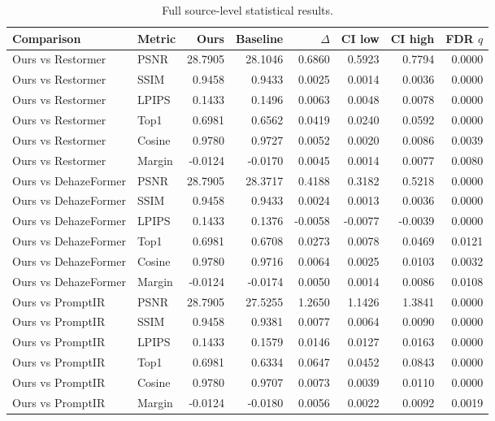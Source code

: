 \begin{longtable}{llrrrrrr}
\caption{Full source-level statistical results.} \\
\toprule
Comparison & Metric & Ours & Baseline & $\Delta$ & CI low & CI high & FDR $q$ \\
\midrule
Ours vs Restormer & PSNR & 28.7905 & 28.1046 & 0.6860 & 0.5923 & 0.7794 & 0.0000 \\
Ours vs Restormer & SSIM & 0.9458 & 0.9433 & 0.0025 & 0.0014 & 0.0036 & 0.0000 \\
Ours vs Restormer & LPIPS & 0.1433 & 0.1496 & 0.0063 & 0.0048 & 0.0078 & 0.0000 \\
Ours vs Restormer & Top1 & 0.6981 & 0.6562 & 0.0419 & 0.0240 & 0.0592 & 0.0000 \\
Ours vs Restormer & Cosine & 0.9780 & 0.9727 & 0.0052 & 0.0020 & 0.0086 & 0.0039 \\
Ours vs Restormer & Margin & -0.0124 & -0.0170 & 0.0045 & 0.0014 & 0.0077 & 0.0080 \\
Ours vs DehazeFormer & PSNR & 28.7905 & 28.3717 & 0.4188 & 0.3182 & 0.5218 & 0.0000 \\
Ours vs DehazeFormer & SSIM & 0.9458 & 0.9433 & 0.0024 & 0.0013 & 0.0036 & 0.0000 \\
Ours vs DehazeFormer & LPIPS & 0.1433 & 0.1376 & -0.0058 & -0.0077 & -0.0039 & 0.0000 \\
Ours vs DehazeFormer & Top1 & 0.6981 & 0.6708 & 0.0273 & 0.0078 & 0.0469 & 0.0121 \\
Ours vs DehazeFormer & Cosine & 0.9780 & 0.9716 & 0.0064 & 0.0025 & 0.0103 & 0.0032 \\
Ours vs DehazeFormer & Margin & -0.0124 & -0.0174 & 0.0050 & 0.0014 & 0.0086 & 0.0108 \\
Ours vs PromptIR & PSNR & 28.7905 & 27.5255 & 1.2650 & 1.1426 & 1.3841 & 0.0000 \\
Ours vs PromptIR & SSIM & 0.9458 & 0.9381 & 0.0077 & 0.0064 & 0.0090 & 0.0000 \\
Ours vs PromptIR & LPIPS & 0.1433 & 0.1579 & 0.0146 & 0.0127 & 0.0163 & 0.0000 \\
Ours vs PromptIR & Top1 & 0.6981 & 0.6334 & 0.0647 & 0.0452 & 0.0843 & 0.0000 \\
Ours vs PromptIR & Cosine & 0.9780 & 0.9707 & 0.0073 & 0.0039 & 0.0110 & 0.0000 \\
Ours vs PromptIR & Margin & -0.0124 & -0.0180 & 0.0056 & 0.0022 & 0.0092 & 0.0019 \\

\end{longtable}
